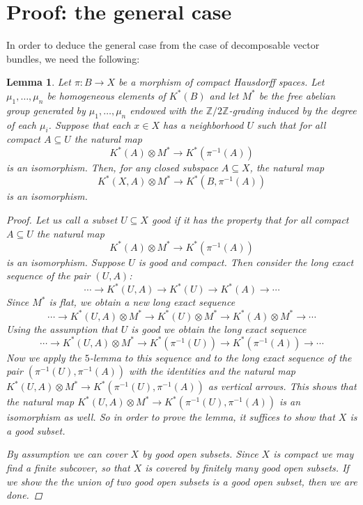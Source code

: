 \documentclass[12pt,a4paper]{amsart}
\theoremstyle{plain}
\newtheorem{lm}[thm]{Lemma}
\theoremstyle{definition}
\theoremstyle{remark}
\begin{document}
\section{Proof: the general case}

In order to deduce the general case from the case of decomposable vector bundles, we need the following:

\begin{lm}\label{lm:lerayhirsch}
  Let $\pi \colon B \to X$ be a morphism of compact Hausdorff spaces.
  Let $\mu_{1}, \ldots, \mu_{n}$ be homogeneous elements of $K^{*}(B)$ and let $M^{*}$ be the free abelian group generated by $\mu_{1}, \ldots, \mu_{n}$ endowed with the $\mathbb{Z}/2\mathbb{Z}$-grading induced by the degree of each $\mu_{i}$.
  Suppose that each $x \in X$ has a neighborhood $U$ such that for all compact $A \subseteq U$ the natural map
  \[ K^{*}(A) \otimes M^{*} \to K^{*}(\pi^{-1}(A)) \]
  is an isomorphism.
  Then, for any closed subspace $A \subseteq X$, the natural map
  \[ K^{*}(X,A) \otimes M^{*} \to K^{*}(B, \pi^{-1}(A)) \]
  is an isomorphism.
  
  \begin{proof}
    Let us call a subset $U \subseteq X$ \textit{good} if it has the property that for all compact $A \subseteq U$ the natural map
    \[ K^{*}(A) \otimes M^{*} \to K^{*}(\pi^{-1}(A)) \]
    is an isomorphism.
    Suppose $U$ is good and compact.
    Then consider the long exact sequence of the pair $(U,A)$:
    \[ \cdots \to K^{*}(U,A) \to K^{*}(U) \to K^{*}(A) \to \cdots \]
    Since $M^{*}$ is flat, we obtain a new long exact sequence
    \[ \cdots \to K^{*}(U,A) \otimes M^{*} \to K^{*}(U) \otimes M^{*} \to K^{*}(A) \otimes M^{*} \to \cdots \]
    Using the assumption that $U$ is good we obtain the long exact sequence
    \[ \cdots \to K^{*}(U, A) \otimes M^{*} \to K^{*}(\pi^{-1}(U)) \to K^{*}(\pi^{-1}(A)) \to \cdots \]
    Now we apply the $5$-lemma to this sequence and to the long exact sequence of the pair $(\pi^{-1}(U), \pi^{-1}(A))$ with the identities and the natural map $K^{*}(U,A) \otimes M^{*} \to K^{*}(\pi^{-1}(U), \pi^{-1}(A))$ as vertical arrows.
    This shows that the natural map $K^{*}(U,A) \otimes M^{*} \to K^{*}(\pi^{-1}(U), \pi^{-1}(A))$ is an isomorphism as well.
    So in order to prove the lemma, it suffices to show that $X$ is a good subset.

    By assumption we can cover $X$ by good open subsets.
    Since $X$ is compact we may find a finite subcover, so that $X$ is covered by finitely many good open subsets.
    If we show the the union of two good open subsets is a good open subset, then we are done.


\end{proof}
\end{lm}
\end{document}
